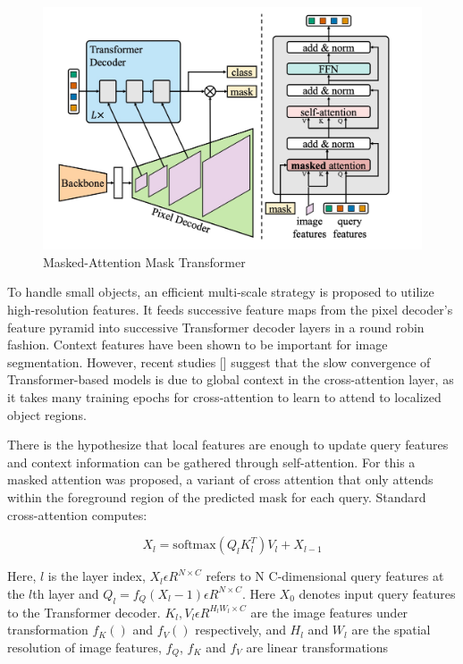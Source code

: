 \begin{figure}[h!]
    \centering
    \includegraphics[scale=0.8]{Figures/MaskAttentionMaskTransformer.jpg}
    \caption{Masked-Attention Mask Transformer}
    \label{fig:mamt}
\end{figure}


\newpage
To handle small objects, an efficient multi-scale strategy is proposed to utilize high-resolution features. It feeds successive feature maps from the 
pixel decoder’s feature pyramid into successive Transformer  decoder layers in a round robin fashion. 
Context features have been shown to be important for image segmentation. However, recent studies [] suggest that the slow convergence of 
Transformer-based models is due to global context in the cross-attention layer, as it takes many training epochs for cross-attention to learn to attend to 
localized object regions. 

There is the hypothesize that local features are enough to update query features and context information can be gathered through self-attention. 
For this a masked attention was proposed, a variant of cross attention that only attends within the foreground region of the predicted mask for each query. 
Standard cross-attention computes:

\begin{equation}
    X_l = \text{softmax}(Q_l K_l^T) V_l + X_{l-1} \tag{6}
\end{equation}

Here, $l$ is the layer index, $X_l \epsilon R^{N \times C}$ refers to N C-dimensional query features at the $l$th layer and 
$Q_l = f_Q(X_l-1) \epsilon R^{N \times C} $. Here $X_0$ denotes input query features to the Transformer decoder. $K_l, V_l \epsilon R^{H_l W_l \times C}$ are the 
image features under transformation $f_K()$ and $f_{V}()$ respectively, and $H_l$ and $W_l$ are the spatial resolution of image features, $f_Q$, $f_K$ and $f_V$ are 
linear transformations


